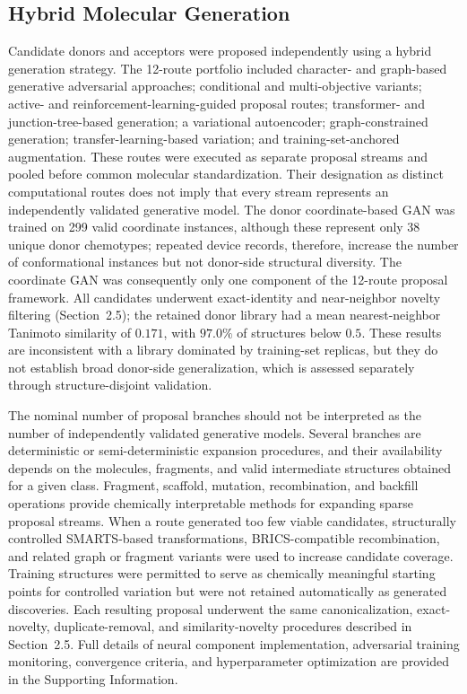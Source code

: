 \documentclass[12pt]{article}
\begin{document}
\subsection{Hybrid Molecular Generation}
Candidate donors and acceptors were proposed independently using a hybrid generation strategy. The 12-route portfolio included character- and graph-based generative adversarial approaches; conditional and multi-objective variants; active- and reinforcement-learning-guided proposal routes; transformer- and junction-tree-based generation; a variational autoencoder; graph-constrained generation; transfer-learning-based variation; and training-set-anchored augmentation. These routes were executed as separate proposal streams and pooled before common molecular standardization. Their designation as distinct computational routes does not imply that every stream represents an independently validated generative model. The donor coordinate-based GAN was trained on 299 valid coordinate instances, although these represent only 38 unique donor chemotypes; repeated device records, therefore, increase the number of conformational instances but not donor-side structural diversity. The coordinate GAN was consequently only one component of the 12-route proposal framework. All candidates underwent exact-identity and near-neighbor novelty filtering (Section~2.5); the retained donor library had a mean nearest-neighbor Tanimoto similarity of $0.171$, with $97.0\%$ of structures below $0.5$. These results are inconsistent with a library dominated by training-set replicas, but they do not establish broad donor-side generalization, which is assessed separately through structure-disjoint validation.

The nominal number of proposal branches should not be interpreted as the number of independently validated generative models. Several branches are deterministic or semi-deterministic expansion procedures, and their availability depends on the molecules, fragments, and valid intermediate structures obtained for a given class. Fragment, scaffold, mutation, recombination, and backfill operations provide chemically interpretable methods for expanding sparse proposal streams. When a route generated too few viable candidates, structurally controlled SMARTS-based transformations, BRICS-compatible recombination, and related graph or fragment variants were used to increase candidate coverage. Training structures were permitted to serve as chemically meaningful starting points for controlled variation but were not retained automatically as generated discoveries. Each resulting proposal underwent the same canonicalization, exact-novelty, duplicate-removal, and similarity-novelty procedures described in Section~2.5. Full details of neural component implementation, adversarial training monitoring, convergence criteria, and hyperparameter optimization are provided in the Supporting Information.
\end{document}
